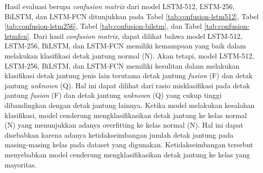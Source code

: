Hasil evaluasi berupa \textit{confusion matrix} dari model LSTM-512, LSTM-256, BiLSTM, dan LSTM-FCN ditunjukkan pada Tabel \ref{tab:confusion-lstm512}, Tabel \ref{tab:confusion-lstm256}, Tabel \ref{tab:confusion-bilstm}, dan Tabel \ref{tab:confusion-lstmfcn}.
Dari hasil \textit{confusion matrix}, dapat dilihat bahwa model LSTM-512, LSTM-256, BiLSTM, dan LSTM-FCN memiliki kemampuan yang baik dalam melakukan klasifikasi detak jantung normal (N).
Akan tetapi, model LSTM-512, LSTM-256, BiLSTM, dan LSTM-FCN memiliki kesulitan dalam melakukan klasifikasi detak jantung jenis lain terutama detak jantung \textit{fusion} (F) dan detak jantung \textit{unknown} (Q).
Hal ini dapat dilihat dari rasio misklasifikasi pada detak jantung \textit{fusion} (F) dan detak jantung \textit{unknown} (Q) yang cukup tinggi dibandingkan dengan detak jantung lainnya.
Ketika model melakukan kesalahan klasifikasi, model cenderung mengklasifikasikan detak jantung ke kelas normal (N) yang menunjukkan adanya overfitting ke kelas normal (N).
Hal ini dapat disebabkan karena adanya ketidakseimbangan jumlah detak jantung pada masing-masing kelas pada dataset yang digunakan.
Ketidakseimbangan tersebut menyebabkan model cenderung mengklasifikasikan detak jantung ke kelas yang mayoritas.


